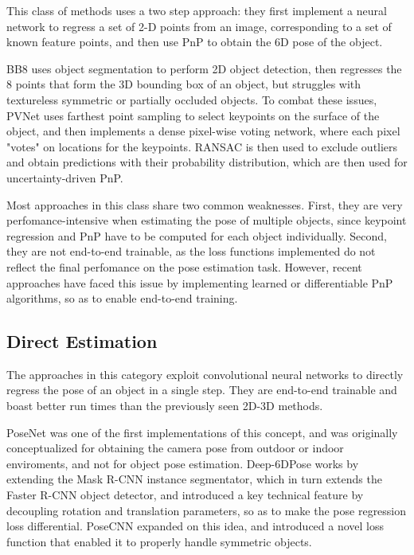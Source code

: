 This class of methods uses a two step approach: they first implement a neural network to regress a set of 2-D points from an image, corresponding to a set of known feature points, and then use PnP to obtain the 6D pose of the object.

BB8\cite{BB8} uses object segmentation to perform 2D object detection, then regresses the 8 points that form the 3D bounding box of an object, but struggles with textureless symmetric or partially occluded objects. To combat these issues, PVNet\cite{PVNet} uses farthest point sampling to select keypoints on the surface of the object, and then implements a dense pixel-wise voting network, where each pixel "votes" on locations for the keypoints. RANSAC\cite{RANSAC} is then used to exclude outliers and obtain predictions with their probability distribution, which are then used for uncertainty-driven PnP.

Most approaches in this class share two common weaknesses. First, they are very perfomance-intensive when estimating the pose of multiple objects, since keypoint regression and PnP have to be computed for each object individually\cite{bukschat2020efficientpose}. Second, they are not end-to-end trainable, as the loss functions implemented do not reflect the final perfomance on the pose estimation task\cite{SS6D}. However, recent approaches have faced this issue by implementing learned or differentiable PnP algorithms, so as to enable end-to-end training\cite{EPro-Pnp}.

\subsection{Direct Estimation}
\label{ss:directestimation}

The approaches in this category exploit convolutional neural networks to directly regress the pose of an object in a single step. They are end-to-end trainable and boast better run times than the previously seen 2D-3D methods.

PoseNet\cite{PoseNet} was one of the first implementations of this concept, and was originally conceptualized for obtaining the camera pose from outdoor or indoor enviroments, and not for object pose estimation. Deep-6DPose\cite{deep6D} works by extending the Mask R-CNN\cite{Mask-R-CNN} instance segmentator, which in turn extends the Faster R-CNN\cite{Faster-R-CNN} object detector, and introduced a key technical feature by decoupling rotation and translation parameters, so as to make the pose regression loss differential. PoseCNN\cite{PoseCNN} expanded on this idea, and introduced a novel loss function that enabled it to properly handle symmetric objects.

